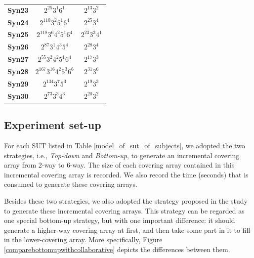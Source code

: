 \documentclass[conference]{IEEEtran}
\theoremstyle{definition}
\begin{document}
\begin{table}[!ht]
\begin{tabular}{|c|c|c|}
    \textbf{Syn23} & $2^{25}3^{1}6^{1}$ & $2^{13}3^{2}$ \\
    \textbf{Syn24} & $2^{110}3^{2}5^{1}6^{4}$ & $2^{25}3^{4}$ \\
    \textbf{Syn25} & $2^{118}3^{6}4^{2}5^{1}6^{4}$ & $2^{23}3^{3}4^{1}$ \\
    \textbf{Syn26} & $2^{87}3^{1}4^{3}5^{4}$ & $2^{28}3^{4}$ \\
    \textbf{Syn27} & $2^{55}3^{2}4^{2}5^{1}6^{4}$ & $2^{17}3^{3}$  \\
    \textbf{Syn28} & $2^{167}3^{16}4^{2}5^{3}6^{6}$ & $2^{31}3^{6}$ \\
    \textbf{Syn29} & $2^{134}3^{7}5^{3}$ & $2^{19}3^{3}$ \\
    \textbf{Syn30} & $2^{73}3^{3}4^{3}$ & $2^{20}3^{2}$ \\
    \hline
    \end{tabular}%
  \end{table}





\subsection{Experiment set-up}
For each SUT listed in Table \ref{model_of_sut_of_subjects}, we adopted the two strategies, i.e., \emph{Top-down} and \emph{Bottom-up}, to generate an incremental covering array from 2-way to 6-way. The size of each covering array contained in this  incremental covering array is recorded. We also record the time (seconds) that is consumed to generate these covering arrays.

Besides these two strategies, we also adopted the strategy proposed in the study \cite{fouche2009incremental} to generate these incremental covering arrays. This strategy can be regarded as one special bottom-up strategy, but with one important difference: it should generate a higher-way covering array at first, and then take some part in it to fill in the lower-covering array.
More specifically, Figure \ref{comparebottomupwithcollaborative} depicts the differences between them.
\end{document}
